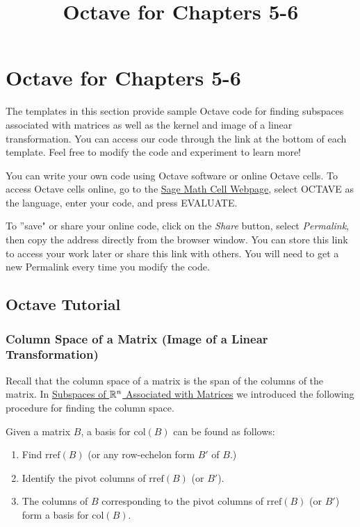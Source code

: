 \documentclass{ximera}
\title{Octave for Chapters 5-6} \license{CC BY-NC-SA 4.0}
\begin{document}
\begin{abstract}
\end{abstract}
\maketitle

\section*{Octave for Chapters 5-6}

The templates in this section provide sample Octave code for finding subspaces associated with matrices as well as the kernel and image of a linear transformation. You can access our code through the link at the bottom of each template.  Feel free to modify the code and experiment to learn more!  

You can write your own code using Octave software or online Octave cells.  To access Octave cells online, go to the \href{https://sagecell.sagemath.org/}{Sage Math Cell Webpage}, select OCTAVE as the language, enter your code, and press EVALUATE.  

To ''save" or share your online code, click on the \emph{Share} button, select \emph{Permalink}, then copy the address directly from the browser window.  You can store this link to access your work later or share this link with others.  You will need to get a new Permalink every time you modify the code.

\subsection*{Octave Tutorial}
\subsubsection*{Column Space of a Matrix (Image of a Linear Transformation)}
Recall that the column space of a matrix is the span of the columns of the matrix.  In \href{https://ximera.osu.edu/linearalgebradzv3/LinearAlgebraInteractiveIntro/VSP-0040/main}{Subspaces of $\mathbb{R}^n$ Associated with Matrices} we introduced the following procedure for finding the column space.

\begin{procedure}[\ref{proc:colspace}]
Given a matrix $B$, a basis for $\mbox{col}(B)$ can be found as follows:
\begin{enumerate}
\item Find $\mbox{rref}(B)$ (or any row-echelon form $B'$ of $B$.)
\item Identify the pivot columns of $\mbox{rref}(B)$ (or $B'$).
\item The columns of $B$ corresponding to the pivot columns of $\mbox{rref}(B)$ (or $B'$) form a basis for $\mbox{col}(B)$.
\end{enumerate}
\end{procedure}
\end{document}
